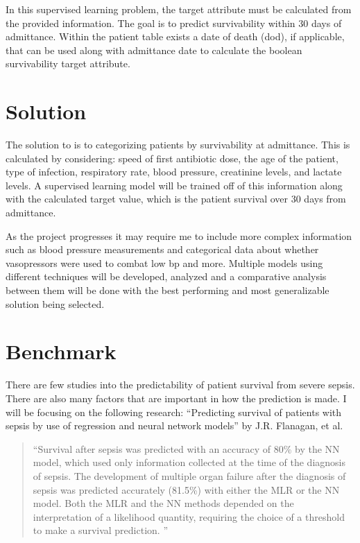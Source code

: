 \documentclass[11pt]{article}
\begin{document}
In this supervised learning problem, the target attribute must be calculated from the provided information. The goal is to predict survivability within 30 days of admittance. Within the patient table exists a date of death (dod), if applicable, that can be used along with admittance date to calculate the boolean survivability target attribute.


\section{Solution}
The solution to is to categorizing patients by survivability at admittance. This is calculated by considering: speed of first antibiotic dose, the age of the patient, type of infection, respiratory rate, blood pressure, creatinine levels, and lactate levels. A supervised learning model will be trained off of this information along with the calculated target value, which is the patient survival over 30 days from admittance.

As the project progresses it may require me to include more complex information such as blood pressure measurements and categorical data about whether vasopressors were used to combat low bp and more.
Multiple models using different techniques will be developed, analyzed and a comparative analysis between them will be done with the best performing and most generalizable solution being selected.

\section{Benchmark}
There are few studies into the predictability of patient survival from severe sepsis. There are also many factors that are important in how the prediction is made. I will be focusing on the following research: ``Predicting survival of patients with sepsis by use of regression and neural network models'' by J.R. Flanagan, et al. 
\begin{quotation}
  ``Survival after sepsis was predicted with an accuracy of 80\% by the NN model, which used only information collected at the time of the diagnosis of sepsis. The development of multiple organ failure after the diagnosis of sepsis was predicted accurately (81.5\%) with either the MLR or the NN model. Both the MLR and the NN methods depended on the interpretation of a likelihood quantity, requiring the choice of a threshold to make a survival prediction. ''\cite{sepsisresearch}
\end{quotation}
\end{document}
